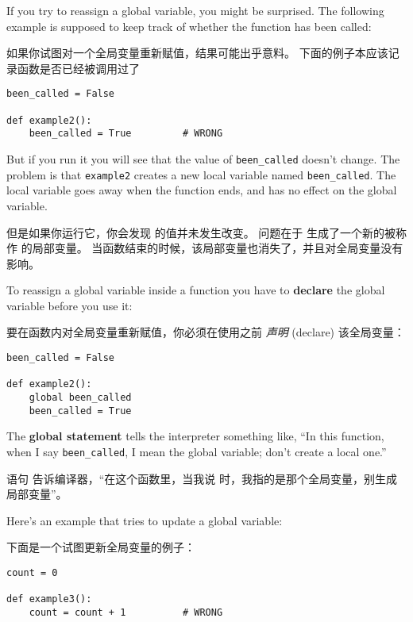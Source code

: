 %
If you try to reassign a global variable, you might be surprised.
The following example is supposed to keep track of whether the
function has been called:

如果你试图对一个全局变量重新赋值，结果可能出乎意料。
下面的例子本应该记录函数是否已经被调用过了


\begin{lstlisting}
been_called = False

def example2():
    been_called = True         # WRONG
\end{lstlisting}

%
But if you run it you will see that the value of \verb"been_called"
doesn't change.  The problem is that {\tt example2} creates a new local
variable named \verb"been_called".  The local variable goes away when
the function ends, and has no effect on the global variable.

但是如果你运行它，你会发现  的值并未发生改变。
问题在于  生成了一个新的被称作  的局部变量。
当函数结束的时候，该局部变量也消失了，并且对全局变量没有影响。

  

To reassign a global variable inside a function you have to
{\bf declare} the global variable before you use it:

要在函数内对全局变量重新赋值，你必须在使用之前 {\em 声明} (declare) 该全局变量：

\begin{lstlisting}
been_called = False

def example2():
    global been_called
    been_called = True
\end{lstlisting}

%
The {\bf global statement} tells the interpreter
something like, ``In this function, when I say \verb"been_called", I
mean the global variable; don't create a local one.''

 语句 告诉编译器，``在这个函数里，当我说  时，我指的是那个全局变量，别生成局部变量''。

  

Here's an example that tries to update a global variable:

下面是一个试图更新全局变量的例子：

\begin{lstlisting}
count = 0

def example3():
    count = count + 1          # WRONG
\end{lstlisting}

